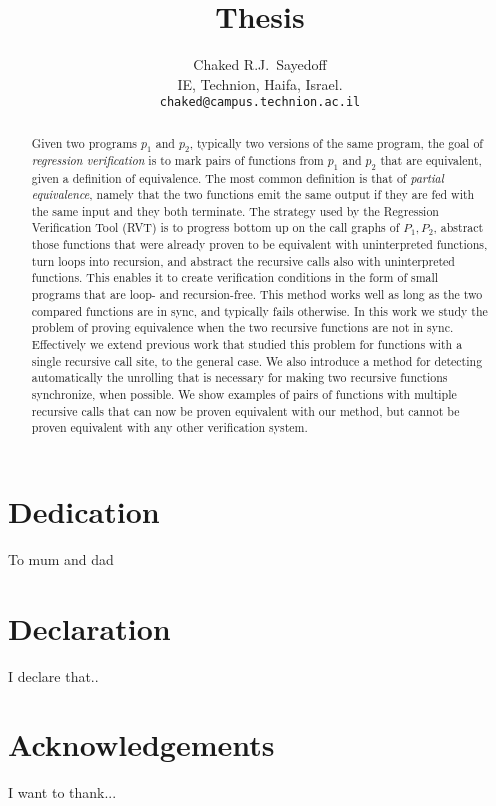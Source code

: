 \documentclass[12pt]{report}
\title{Thesis}
\author{
  Chaked R.J.~Sayedoff \\
  IE, Technion, Haifa, Israel.\\
    \texttt{chaked@campus.technion.ac.il}\\
}
\begin{document}
\maketitle
\begin{abstract}
Given two programs $p_1$ and $p_2$, typically two versions of the same program, the goal of \emph{regression verification} is to mark pairs of functions from $p_1$ and $p_2$ that are equivalent, given a definition of equivalence. The most common definition is that of \emph{partial equivalence}, namely that the two functions emit the same output if they are fed with the same input and they both terminate. 
The strategy used by the Regression Verification Tool (RVT) is to progress bottom up on the call graphs of $P_1,P_2$, abstract those functions that were already proven to be equivalent with uninterpreted functions, turn loops into recursion, and abstract the recursive calls also with uninterpreted functions. This enables it to create verification conditions in the form of small programs that are loop- and recursion-free. This method works well as long as the two compared functions are in sync, and typically fails otherwise. In this work we study the problem of proving equivalence when the two recursive functions are not in sync. Effectively we extend  previous work that studied this problem for functions with a single recursive call site, to the general case. We also introduce a method for detecting automatically the unrolling that is necessary for making two recursive functions synchronize, when possible. We show examples of pairs of functions with multiple recursive calls that can now be proven equivalent with our method, but cannot be proven equivalent with any other verification system.
\end{abstract}

\chapter*{Dedication}
To mum and dad

\chapter*{Declaration}
I declare that..

\chapter*{Acknowledgements}
I want to thank...

\tableofcontents
\end{document}
